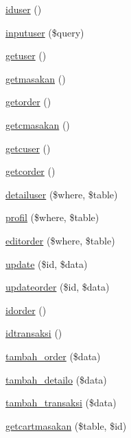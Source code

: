 \begin{DoxyCompactItemize}
\item 
\mbox{\hyperlink{class_mwaiter_ae585015ef84ce17375a2e7a05797b74d}{iduser}} ()
\item 
\mbox{\hyperlink{class_mwaiter_a8f5325239f2561a5609cd78afd4122e4}{inputuser}} (\$query)
\item 
\mbox{\hyperlink{class_mwaiter_acf56a129891ee0628a6367f8654f6833}{getuser}} ()
\item 
\mbox{\hyperlink{class_mwaiter_af6cb3909c84d55dc39b68e22ad1c7ad3}{getmasakan}} ()
\item 
\mbox{\hyperlink{class_mwaiter_a13da94d69caff313d692ca030da878ef}{getorder}} ()
\item 
\mbox{\hyperlink{class_mwaiter_a9d032035c2608fe02d59175884d5bedf}{getcmasakan}} ()
\item 
\mbox{\hyperlink{class_mwaiter_a4a6926535956c4cfdc6da2ddc5cec60d}{getcuser}} ()
\item 
\mbox{\hyperlink{class_mwaiter_adb847d1e2a9cd0bc6d7ed279bc06fc8d}{getcorder}} ()
\item 
\mbox{\hyperlink{class_mwaiter_a0816784375f5f69ab5d0aefc27827d55}{detailuser}} (\$where, \$table)
\item 
\mbox{\hyperlink{class_mwaiter_a76e16cab9f6d103739adac11e86bce5f}{profil}} (\$where, \$table)
\item 
\mbox{\hyperlink{class_mwaiter_a9d4869568420c3e2e51d3c39010a87d9}{editorder}} (\$where, \$table)
\item 
\mbox{\hyperlink{class_mwaiter_acaa59d49766017d95ff8c84597aa88b8}{update}} (\$id, \$data)
\item 
\mbox{\hyperlink{class_mwaiter_a88ac8aa31ee6385755cd8de23c3992cb}{updateorder}} (\$id, \$data)
\item 
\mbox{\hyperlink{class_mwaiter_a609d55790b70e6c172ee10588e0c8453}{idorder}} ()
\item 
\mbox{\hyperlink{class_mwaiter_a5a1657a2dffccf36eb0efe5d7f83bd5a}{idtransaksi}} ()
\item 
\mbox{\hyperlink{class_mwaiter_a942758017dc79d0d59bf4ba7b09d0b53}{tambah\+\_\+order}} (\$data)
\item 
\mbox{\hyperlink{class_mwaiter_a8cb5db96c9950be16b2f23d67501bf44}{tambah\+\_\+detailo}} (\$data)
\item 
\mbox{\hyperlink{class_mwaiter_a714bedce1322d287bcfb93295feddb9c}{tambah\+\_\+transaksi}} (\$data)
\item 
\mbox{\hyperlink{class_mwaiter_a2198aaef72ab6b5eb46c54b7a48569cf}{getcartmasakan}} (\$table, \$id)

\end{DoxyCompactItemize}
